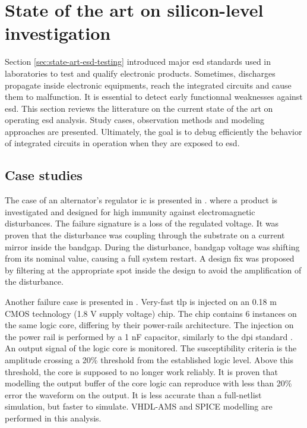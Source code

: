 \section{State of the art on silicon-level investigation}

Section \ref{sec:state-art-esd-testing} introduced major \gls{esd} standards used in laboratories to test and qualify electronic products.
Sometimes, discharges propagate inside electronic equipments, reach the integrated circuits and cause them to malfunction.
It is essential to detect early functionnal weaknesses against \gls{esd}.
This section reviews the litterature on the current state of the art on operating \gls{esd} analysis.
Study cases, observation methods and modeling approaches are presented.
Ultimately, the goal is to debug efficiently the behavior of integrated circuits in operation when they are exposed to \gls{esd}.

\subsection{Case studies}

The case of an alternator's regulator \gls{ic} is presented in \cite{softfailEMCIC}.
where a product is investigated and designed for high immunity against electromagnetic disturbances.
The failure signature is a loss of the regulated voltage.
It was proven that the disturbance was coupling through the substrate on a current mirror inside the bandgap.
During the disturbance, bandgap voltage was shifting from its nominal value, causing a full system restart.
A design fix was proposed by filtering at the appropriate spot inside the design to avoid the amplification of the disturbance.

Another failure case is presented in \cite{LacrampeTransientImmunity}.
Very-fast \gls{tlp} is injected on an 0.18 \textmu{}m CMOS technology (1.8 V supply voltage) chip.
The chip contains 6 instances on the same logic core, differing by their power-rails architecture.
The injection on the power rail is performed by a 1 nF capacitor, similarly to the \gls{dpi} standard \cite{iec62132-4}.
An output signal of the logic core is monitored.
The susceptibility criteria is the amplitude crossing a 20\% threshold from the established logic level.
Above this threshold, the core is supposed to no longer work reliably.
It is proven that modelling the output buffer of the core logic can reproduce with less than 20\% error the waveform on the output.
It is less accurate than a full-netlist simulation, but faster to simulate.
VHDL-AMS and SPICE modelling are performed in this analysis.

